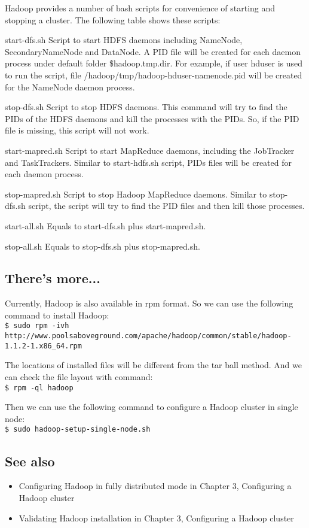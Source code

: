 Hadoop provides a number of bash scripts for convenience of starting and stopping a cluster. The following table shows these scripts:
\begin{description}
    \item{start-dfs.sh} Script to start HDFS daemons including NameNode, SecondaryNameNode and DataNode. A PID file will be created for each daemon process under default folder \${hadoop.tmp.dir}. For example, if user hduser is used to run the script, file /hadoop/tmp/hadoop-hduser-namenode.pid will be created for the NameNode daemon process.
    \item{stop-dfs.sh} Script to stop HDFS daemons. This command will try to find the PIDs of the HDFS daemons and kill the processes with the PIDs. So, if the PID file is missing, this script will not work.
    \item{start-mapred.sh} Script to start MapReduce daemons, including the JobTracker and TaskTrackers. Similar to start-hdfs.sh script, PIDs files will be created for each daemon process.
    \item{stop-mapred.sh} Script to stop Hadoop MapReduce daemons. Similar to stop-dfs.sh script, the script will try to find the PID files and then kill those processes.
    \item{start-all.sh} Equals to start-dfs.sh plus start-mapred.sh.
    \item{stop-all.sh} Equals to stop-dfs.sh plus stop-mapred.sh.
\end{description}
\subsection*{There's more...}
Currently, Hadoop is also available in rpm format. So we can use the following command to install Hadoop: \\
\verb|$ sudo rpm -ivh http://www.poolsaboveground.com/apache/hadoop/common/stable/hadoop-1.1.2-1.x86_64.rpm|

The locations of installed files will be different from the tar ball method. And we can check the file layout with command: \\
\verb|$ rpm -ql hadoop|

Then we can use the following command to configure a Hadoop cluster in single node: \\
\verb|$ sudo hadoop-setup-single-node.sh|
\subsection*{See also}
\begin{itemize}
  \item Configuring Hadoop in fully distributed mode in Chapter 3, Configuring a Hadoop cluster
  \item Validating Hadoop installation in Chapter 3, Configuring a Hadoop cluster
\end{itemize}

